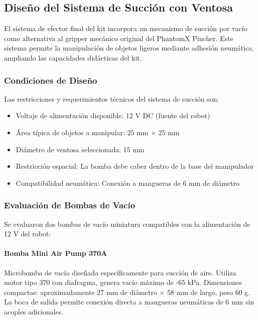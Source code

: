 \subsection{Diseño del Sistema de Succión con Ventosa}

El sistema de efector final del kit incorpora un mecanismo de succión por vacío como alternativa al gripper mecánico original del PhantomX Pincher. Este sistema permite la manipulación de objetos ligeros mediante adhesión neumática, ampliando las capacidades didácticas del kit.

\subsubsection{Condiciones de Diseño}

Las restricciones y requerimientos técnicos del sistema de succión son:

\begin{itemize}
    \item Voltaje de alimentación disponible: 12 V DC (fuente del robot)
    \item Área típica de objetos a manipular: 25 mm × 25 mm
    \item Diámetro de ventosa seleccionada: 15 mm
    \item Restricción espacial: La bomba debe caber dentro de la base del manipulador
    \item Compatibilidad neumática: Conexión a mangueras de 6 mm de diámetro
\end{itemize}

\subsubsection{Evaluación de Bombas de Vacío}

Se evaluaron dos bombas de vacío miniatura compatibles con la alimentación de 12 V del robot:

\paragraph{Bomba Mini Air Pump 370A}

Microbomba de vacío diseñada específicamente para succión de aire. Utiliza motor tipo 370 con diafragma, genera vacío máximo de -65 kPa. Dimensiones compactas: aproximadamente 27 mm de diámetro × 58 mm de largo, peso 60 g. La boca de salida permite conexión directa a mangueras neumáticas de 6 mm sin acoples adicionales.

